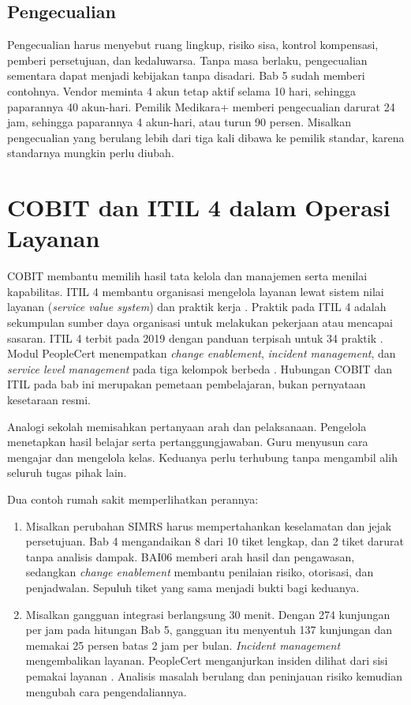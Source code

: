 \subsection*{Pengecualian}

Pengecualian harus menyebut ruang lingkup, risiko sisa, kontrol kompensasi, pemberi persetujuan,
dan kedaluwarsa. Tanpa masa berlaku, pengecualian sementara dapat menjadi kebijakan tanpa disadari.
Bab 5 sudah memberi contohnya. Vendor meminta 4 akun tetap aktif selama 10 hari, sehingga
paparannya 40 akun-hari. Pemilik Medikara+ memberi pengecualian darurat 24 jam, sehingga paparannya
4 akun-hari, atau turun 90 persen. Misalkan pengecualian yang berulang lebih dari tiga kali dibawa
ke pemilik standar, karena standarnya mungkin perlu diubah.

\section{COBIT dan ITIL 4 dalam Operasi Layanan}

COBIT membantu memilih hasil tata kelola dan manajemen serta menilai kapabilitas. ITIL 4 membantu
organisasi mengelola layanan lewat sistem nilai layanan (\textit{service value system}) dan
praktik kerja \cite{cobit2019-intro,itil4}. Praktik pada ITIL 4 adalah sekumpulan sumber daya
organisasi untuk melakukan pekerjaan atau mencapai sasaran. ITIL 4 terbit pada 2019 dengan panduan
terpisah untuk 34 praktik \cite{c08-griffith-praktik}. Modul PeopleCert menempatkan \textit{change
enablement}, \textit{incident management}, dan \textit{service level management} pada tiga
kelompok berbeda \cite{c08-peoplecert-modul}. Hubungan COBIT dan ITIL pada bab ini merupakan
pemetaan pembelajaran, bukan pernyataan kesetaraan resmi.

Analogi sekolah memisahkan pertanyaan arah dan pelaksanaan. Pengelola menetapkan hasil belajar
serta pertanggungjawaban. Guru menyusun cara mengajar dan mengelola kelas. Keduanya perlu terhubung
tanpa mengambil alih seluruh tugas pihak lain.

Dua contoh rumah sakit memperlihatkan perannya:
\begin{enumerate}
  \item Misalkan perubahan SIMRS harus mempertahankan keselamatan dan jejak persetujuan. Bab 4
  mengandaikan 8 dari 10 tiket lengkap, dan 2 tiket darurat tanpa analisis dampak. BAI06 memberi
  arah hasil dan pengawasan, sedangkan \textit{change enablement} membantu penilaian risiko,
  otorisasi, dan penjadwalan. Sepuluh tiket yang sama menjadi bukti bagi keduanya.
  \item Misalkan gangguan integrasi berlangsung 30 menit. Dengan 274 kunjungan per jam pada
  hitungan Bab 5, gangguan itu menyentuh 137 kunjungan dan memakai 25 persen batas 2 jam per bulan.
  \textit{Incident management} mengembalikan layanan. PeopleCert menganjurkan insiden dilihat dari
  sisi pemakai layanan \cite{c08-griffith-praktik}. Analisis masalah berulang dan peninjauan risiko
  kemudian mengubah cara pengendaliannya.
\end{enumerate}

